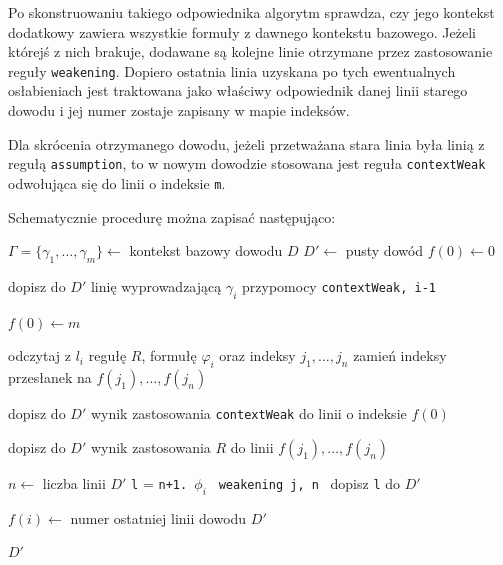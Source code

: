 \documentclass[shortabstract]{iithesis}
\theoremstyle{definition}
\theoremstyle{remark}
\theoremstyle{plain}
\begin{document}
Po skonstruowaniu takiego odpowiednika algorytm sprawdza, czy jego kontekst
dodatkowy zawiera wszystkie formuły z dawnego kontekstu bazowego. Jeżeli którejś
z nich brakuje, dodawane są kolejne linie otrzymane przez zastosowanie reguły
\texttt{weakening}. Dopiero ostatnia linia uzyskana po tych ewentualnych osłabieniach
jest traktowana jako właściwy odpowiednik danej linii starego dowodu i jej numer
zostaje zapisany w mapie indeksów.

Dla skrócenia otrzymanego dowodu, jeżeli przetważana stara linia była linią z regułą \texttt{assumption},
to w nowym dowodzie stosowana jest reguła \texttt{contextWeak} odwołująca się do linii o indeksie \texttt{m}.
  
Schematycznie procedurę można zapisać następująco:

\begin{algorithm}[H]
\caption{Usuwanie kontekstu bazowego}
\label{alg:remove-base-context}
\begin{algorithmic}[1]
    \State $\Gamma=\{\gamma_1,\ldots,\gamma_m\} \gets$ kontekst bazowy dowodu $D$
    \State $D' \gets$ pusty dowód
    \State $f(0) \gets 0$

        \State dopisz do $D'$ linię wyprowadzającą $\gamma_i$ przypomocy \texttt{contextWeak, i-1}
    \EndFor

    \State $f(0) \gets m$

        \State odczytaj z $l_i$ regułę $R$, formułę $\varphi_i$ oraz indeksy $j_1,\ldots,j_n$
        \State zamień indeksy przesłanek na $f(j_1),\ldots,f(j_n)$

            \State dopisz do $D'$ wynik zastosowania \texttt{contextWeak} do linii o indeksie $f(0)$
        \EndIf
     
            \State dopisz do $D'$ wynik zastosowania $R$ do linii $f(j_1),\ldots,f(j_n)$

                \State $n \gets$ liczba linii $D'$
                \State \texttt{l} = \texttt{n+1. }$\phi_i$ \texttt{ weakening j, n}
                \State dopisz \texttt{l} do $D'$ 
            \EndIf
        \EndFor
        \EndIf
          
        

        \State $f(i) \gets$ numer ostatniej linii dowodu $D'$
    \EndFor

    \State \Return $D'$
\EndProcedure
\end{algorithmic}
\end{algorithm}
\end{document}
